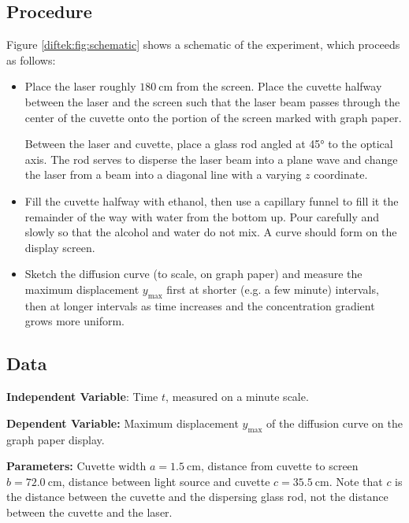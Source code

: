 \documentclass[11pt, a4paper]{article}
\begin{document}
\subsection{Procedure}
Figure \ref{diftek:fig:schematic} shows a schematic of the experiment, which proceeds as follows:
\begin{itemize}
	\item Place the laser roughly $ \SI{180}{\centi \meter} $ from the screen. Place the cuvette halfway between the laser and the screen such that the laser beam passes through the center of the cuvette onto the portion of the screen marked with graph paper.
	
	Between the laser and cuvette, place a glass rod angled at \ang{45} to the optical axis. The rod serves to disperse the laser beam into a plane wave and change the laser from a beam into a diagonal line with a varying $ z $ coordinate.
	
	\item Fill the cuvette halfway with ethanol, then use a capillary funnel to fill it the remainder of the way with water from the bottom up. Pour carefully and slowly so that the alcohol and water do not mix. A curve should form on the display screen.
	
	\item Sketch the diffusion curve (to scale, on graph paper) and measure the maximum displacement $ y_{\text{max}} $ first at shorter (e.g. a few minute) intervals, then at longer intervals as time increases and the concentration gradient grows more uniform. 
	
\end{itemize}

\subsection{Data}
\textbf{Independent Variable}: Time $ t $, measured on a minute scale.

\vspace{2mm}
\textbf{Dependent Variable:} Maximum displacement $ y_{\text{max}} $ of the diffusion curve on the graph paper display.

\vspace{2mm}
\textbf{Parameters:} Cuvette width $ a = \SI{1.5}{\centi \meter} $, distance from cuvette to screen $ b =  \SI{72.0}{\centi \meter} $, distance between light source and cuvette $ c =  \SI{35.5}{\centi \meter} $. Note that $ c $ is the distance between the cuvette and the dispersing glass rod, not the distance between the cuvette and the laser.
\end{document}
